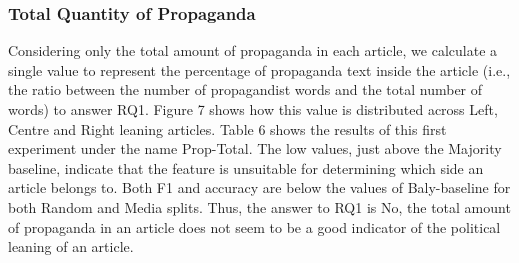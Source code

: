 
\subsubsection{Total Quantity of Propaganda}
Considering only the total amount of propaganda in each article, we calculate a single value to represent the percentage of propaganda text inside the article (i.e., the ratio between the number of propagandist words and the total number of words) to answer RQ1.
Figure 7 shows how this value is distributed across Left, Centre and Right leaning articles. Table 6 shows the results of this first experiment under the name Prop-Total. The low values, just above the Majority baseline, indicate that the feature is unsuitable for determining which side an article belongs to. Both F1 and accuracy are below the values of Baly-baseline for both Random and Media splits. Thus, the answer to RQ1 is No, the total amount of propaganda in an article does not seem to be a good indicator of the political leaning of an article.

